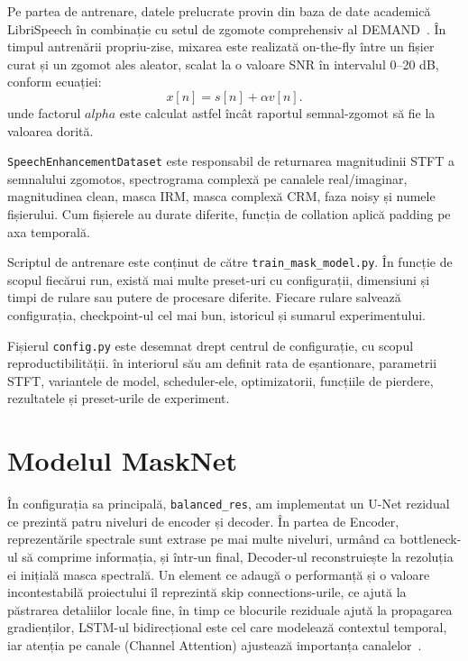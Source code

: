 \documentclass[12pt,a4paper]{report}
\begin{document}
Pe partea de antrenare, datele prelucrate provin din baza de date 
academică LibriSpeech în combinație cu setul de zgomote comprehensiv 
al DEMAND~\cite{librispeech,demand}. În timpul antrenării propriu-zise, mixarea este realizată 
on-the-fly între un fișier curat și un zgomot ales aleator, scalat la 
o valoare SNR în intervalul 0--20 dB, conform ecuației:
\[
x[n] = s[n] + \alpha v[n].
\]
unde factorul \(alpha\) este calculat astfel încât raportul semnal-zgomot 
să fie la valoarea dorită.

\texttt{SpeechEnhancementDataset} este responsabil de returnarea magnitudinii 
STFT a semnalului zgomotos, spectrograma complexă pe canalele real/imaginar, 
magnitudinea clean, masca IRM, masca complexă CRM, faza noisy și numele 
fișierului. Cum fișierele au durate diferite, funcția de collation aplică 
padding pe axa temporală.

Scriptul de antrenare este conținut de către \texttt{train\_mask\_model.py}. 
În funcție de scopul fiecărui run, există mai multe preset-uri cu 
configurații, dimensiuni și timpi de rulare sau putere de procesare 
diferite. Fiecare rulare salvează configurația, checkpoint-ul cel mai
bun, istoricul și sumarul experimentului.

Fișierul \texttt{config.py} este desemnat drept centrul de configurație, 
cu scopul reproductibilității. în interiorul său am definit rata de 
eșantionare, parametrii STFT, variantele de model, scheduler-ele, 
optimizatorii, funcțiile de pierdere, rezultatele și preset-urile de 
experiment. 

\section{Modelul MaskNet}

În configurația sa principală, \texttt{balanced\_res}, am implementat un U-Net 
rezidual ce prezintă patru niveluri de encoder și decoder. În partea 
de Encoder, reprezentările spectrale sunt extrase pe mai multe 
niveluri, urmând ca bottleneck-ul să comprime informația, și într-un 
final, Decoder-ul reconstruiește la rezoluția ei inițială masca 
spectrală. Un element ce adaugă o performanță și o valoare 
incontestabilă proiectului îl reprezintă skip connections-urile, ce 
ajută la păstrarea detaliilor locale fine, în timp ce blocurile 
reziduale ajută la propagarea gradienților, LSTM-ul bidirecțional 
este cel care modelează contextul temporal, iar atenția pe canale 
(Channel Attention) ajustează importanța canalelor~\cite{unet,resnet,lstm,se}.
\end{document}
